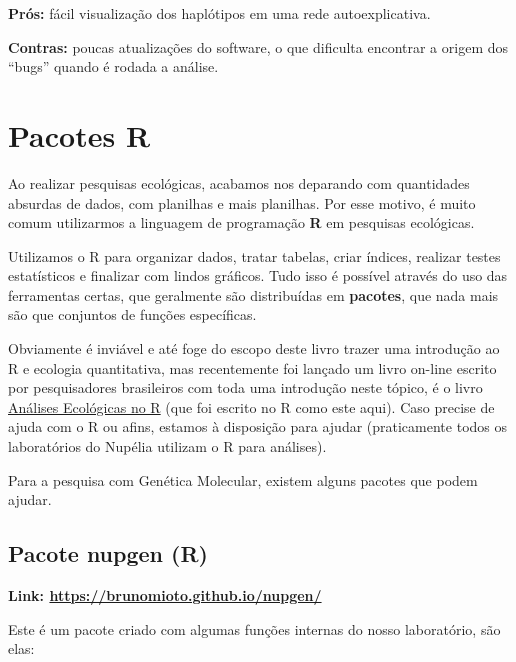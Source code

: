 \documentclass[
  letterpaper,
  DIV=11,
  numbers=noendperiod]{scrreprt}
\begin{document}
\textbf{Prós:} fácil visualização dos haplótipos em uma rede
autoexplicativa.

\textbf{Contras:} poucas atualizações do software, o que dificulta
encontrar a origem dos ``bugs'' quando é rodada a análise.

\hypertarget{pacotes-r}{%
\chapter{Pacotes R}\label{pacotes-r}}

Ao realizar pesquisas ecológicas, acabamos nos deparando com quantidades
absurdas de dados, com planilhas e mais planilhas. Por esse motivo, é
muito comum utilizarmos a linguagem de programação \textbf{R} em
pesquisas ecológicas.

Utilizamos o R para organizar dados, tratar tabelas, criar índices,
realizar testes estatísticos e finalizar com lindos gráficos. Tudo isso
é possível através do uso das ferramentas certas, que geralmente são
distribuídas em \textbf{pacotes}, que nada mais são que conjuntos de
funções específicas.

Obviamente é inviável e até foge do escopo deste livro trazer uma
introdução ao R e ecologia quantitativa, mas recentemente foi lançado um
livro on-line escrito por pesquisadores brasileiros com toda uma
introdução neste tópico, é o livro
\href{https://analises-ecologicas.netlify.app/}{Análises Ecológicas no
R} (que foi escrito no R como este aqui). Caso precise de ajuda com o R
ou afins, estamos à disposição para ajudar (praticamente todos os
laboratórios do Nupélia utilizam o R para análises).

Para a pesquisa com Genética Molecular, existem alguns pacotes que podem
ajudar.

\hypertarget{pacote-nupgen-r}{%
\section{Pacote nupgen (R)}\label{pacote-nupgen-r}}

\textbf{Link: \url{https://brunomioto.github.io/nupgen/}}

Este é um pacote criado com algumas funções internas do nosso
laboratório, são elas:
\end{document}
